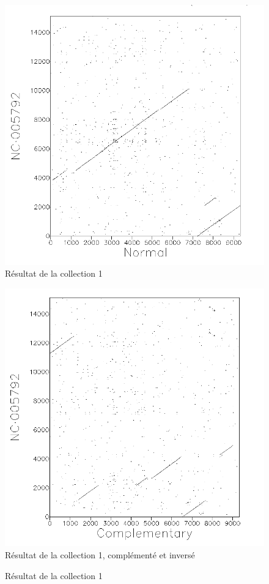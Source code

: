 \begin{figure}[!ht]
	\begin{minipage}[r]{.46\linewidth}
		\begin{center}
		\includegraphics[scale= 0.4]{../res/cible1.png}
		Résultat de la collection 1
	\end{center}
\end{minipage} \hfill
\begin{minipage}[c]{.46 \linewidth}
	\begin{center}
			\includegraphics[scale= 0.4]{../res/cible1-ic.png}
			Résultat de la collection 1, complémenté et inversé
		\end{center}
	\end{minipage}
	\caption{Résultat de la collection 1}
\end{figure}

